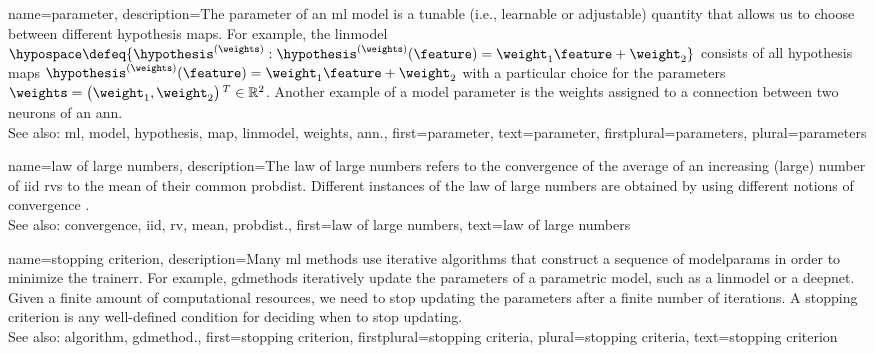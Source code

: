{name={parameter},
	description={The parameter of an \gls{ml} \gls{model} is a tunable (i.e., learnable or adjustable) quantity that 
		allows us to choose between different \gls{hypothesis} \glspl{map}. For example, the \gls{linmodel} 
		$\hypospace \defeq \{\hypothesis^{(\weights)}: \hypothesis^{(\weights)}(\feature)= \weight_{1} \feature + \weight_{2}\}$ 
		consists of all \gls{hypothesis} \glspl{map} $\hypothesis^{(\weights)}(\feature)= \weight_{1} \feature + \weight_{2}$ 
		with a particular choice for the parameters $\weights = \big(\weight_{1},\weight_{2}\big)\,^{T} \in \mathbb{R}^{2}$. 
		Another example of a \gls{model} parameter is the \gls{weights} assigned to a connection between two neurons of an \gls{ann}.
				\\
		See also: \gls{ml}, \gls{model}, \gls{hypothesis}, \gls{map}, \gls{linmodel}, \gls{weights}, \gls{ann}.},
	first={parameter},
	text={parameter},
	firstplural={parameters}, 
 	plural={parameters}
}

{name={law of large numbers},
	description={The law of large numbers refers to the 
		\gls{convergence} of the average of an increasing (large) number of \gls{iid} \glspl{rv} 
		to the \gls{mean} of their common \gls{probdist}. Different instances of the 
		law of large numbers are obtained by using different notions of \gls{convergence} \cite{papoulis}.
				\\
		See also: \gls{convergence}, \gls{iid}, \gls{rv}, \gls{mean}, \gls{probdist}.},
	first={law of large numbers},
	text={law of large numbers}
}
    
{name={stopping criterion},
	description={Many \gls{ml} methods use iterative \glspl{algorithm} 
		that construct a sequence of \glspl{modelparam} in order to minimize the \gls{trainerr}. 
		For example, \glspl{gdmethod} iteratively update the \glspl{parameter} of a parametric \gls{model}, 
		such as a \gls{linmodel} or a \gls{deepnet}. Given a finite amount of computational 
		resources, we need to stop updating the \glspl{parameter} after a finite number of iterations. 
		A stopping criterion is any well-defined condition for deciding when to stop updating.
				\\
		See also: \gls{algorithm}, \gls{gdmethod}.},
	first={stopping criterion},
	firstplural={stopping criteria},
	plural={stopping criteria}, 
	text={stopping criterion}
}

